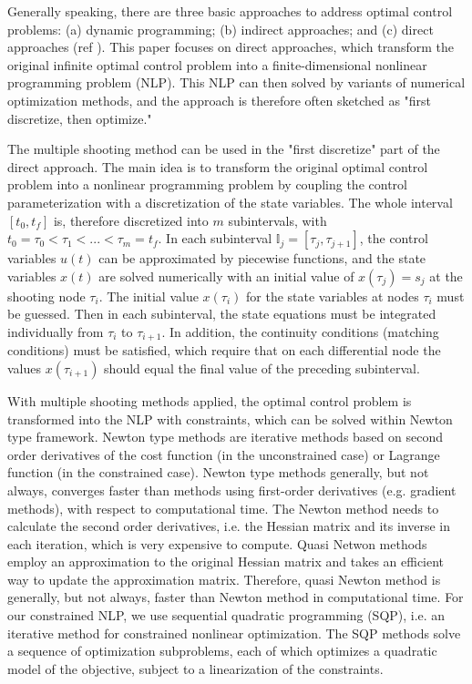 \documentclass  [
  paper    = a4,
  BCOR     = 10mm,
  twoside,
  fontsize = 12pt,
  fleqn,
  toc      = bibnumbered,
  toc      = listofnumbered,
  numbers  = noendperiod,
  headings = normal,
  listof   = leveldown,
  version  = 3.03
]                                       {scrreprt}
\newcommand{\<}{\langle}
\renewcommand{\>}{\rangle}
\begin{document}
Generally speaking, there are three basic approaches to address optimal control problems: (a) dynamic programming; (b) indirect approaches; and (c) direct approaches (ref \cite{MHHP05}). This paper focuses on direct approaches, which transform the original infinite optimal control problem into a finite-dimensional nonlinear programming problem (NLP). This NLP can then solved by variants of numerical optimization methods, and the approach is therefore often sketched as "first discretize, then optimize."

The multiple shooting method can be used in the "first discretize" part of the direct approach. The main idea is to transform the original optimal control problem into a nonlinear programming problem by coupling the control parameterization with a discretization of the state variables. The whole interval $[t_0, t_f]$ is, therefore discretized into $m$ subintervals, with $t_0 = \tau_0 < \tau_1 < ... < \tau_m = t_f$. In each subinterval $\mathbb{I}_j = [\tau_{j}, \tau_{j+1}]$, the control variables $u(t)$ can be approximated by piecewise functions, and the state variables $x(t)$ are solved numerically with an initial value of $x(\tau_j)=s_j$ at the shooting node $\tau_i$. The initial value $x(\tau_i)$ for the state variables at nodes $\tau_i$ must be guessed. Then in each subinterval, the state equations must be integrated individually from $\tau_i$ to $\tau_{i+1}$. In addition, the continuity conditions (matching conditions) must be satisfied, which require that on each differential node the values $x(\tau_{i+1})$ should equal the final value of the preceding subinterval.

With multiple shooting methods applied, the optimal control problem is transformed into the NLP with constraints, which can be solved within Newton type framework. Newton type methods are iterative methods based on second order derivatives of the cost function (in the unconstrained case) or Lagrange function (in the constrained case). Newton type methods generally, but not always, converges faster than methods using first-order derivatives (e.g. gradient methods), with respect to computational time. The Newton method needs to calculate the second order derivatives, i.e. the Hessian matrix and its inverse in each iteration, which is very expensive to compute. Quasi Netwon methods employ an approximation to the original Hessian matrix and takes an efficient way to update the approximation matrix. Therefore, quasi Newton method is generally, but not always, faster than Newton method in computational time. For our constrained NLP, we use sequential quadratic programming (SQP), i.e. an iterative method for constrained nonlinear optimization. The SQP methods solve a sequence of optimization subproblems, each of which optimizes a quadratic model of the objective, subject to a linearization of the constraints.
\end{document}
